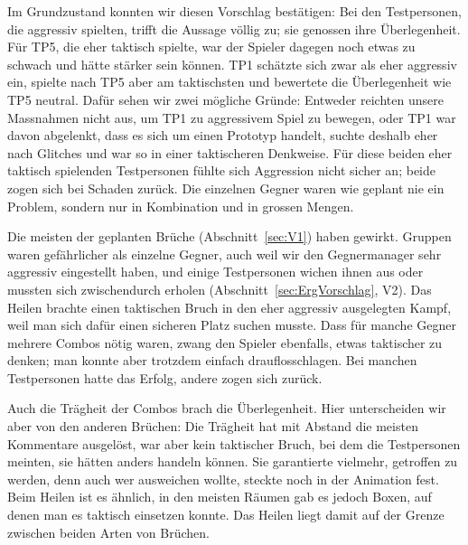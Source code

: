 \documentclass[../Main.tex]{subfiles}
\begin{document}
Im Grundzustand konnten wir diesen Vorschlag bestätigen: Bei den Testpersonen, die aggressiv spielten, trifft die Aussage völlig zu; sie genossen ihre Überlegenheit. Für TP5, die eher taktisch spielte, war der Spieler dagegen noch etwas zu schwach und hätte stärker sein können. TP1 schätzte sich zwar als eher aggressiv ein, spielte nach TP5 aber am taktischsten und bewertete die Überlegenheit wie TP5 neutral. Dafür sehen wir zwei mögliche Gründe: Entweder reichten unsere Massnahmen nicht aus, um TP1 zu aggressivem Spiel zu bewegen, oder TP1 war davon abgelenkt, dass es sich um einen Prototyp handelt, suchte deshalb eher nach Glitches und war so in einer taktischeren Denkweise. Für diese beiden eher taktisch spielenden Testpersonen fühlte sich Aggression nicht sicher an; beide zogen sich bei Schaden zurück. Die einzelnen Gegner waren wie geplant nie ein Problem, sondern nur in Kombination und in grossen Mengen.

Die meisten der geplanten Brüche (Abschnitt~\ref{sec:V1}) haben gewirkt. Gruppen waren gefährlicher als einzelne Gegner, auch weil wir den Gegnermanager sehr aggressiv eingestellt haben, und einige Testpersonen wichen ihnen aus oder mussten sich zwischendurch erholen (Abschnitt~\ref{sec:ErgVorschlag}, V2). Das Heilen brachte einen taktischen Bruch in den eher aggressiv ausgelegten Kampf, weil man sich dafür einen sicheren Platz suchen musste. Dass für manche Gegner mehrere Combos nötig waren, zwang den Spieler ebenfalls, etwas taktischer zu denken; man konnte aber trotzdem einfach drauflosschlagen. Bei manchen Testpersonen hatte das Erfolg, andere zogen sich zurück.

Auch die Trägheit der Combos brach die Überlegenheit. Hier unterscheiden wir aber von den anderen Brüchen: Die Trägheit hat mit Abstand die meisten Kommentare ausgelöst, war aber kein taktischer Bruch, bei dem die Testpersonen meinten, sie hätten anders handeln können. Sie garantierte vielmehr, getroffen zu werden, denn auch wer ausweichen wollte, steckte noch in der Animation fest. Beim Heilen ist es ähnlich, in den meisten Räumen gab es jedoch Boxen, auf denen man es taktisch einsetzen konnte. Das Heilen liegt damit auf der Grenze zwischen beiden Arten von Brüchen.
\end{document}
